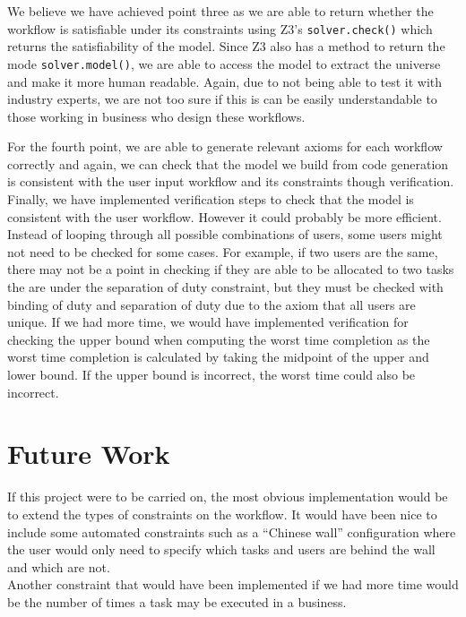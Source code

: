 \documentclass[a4paper]{report}
\begin{document}
We believe we have achieved point three as we are able to return whether the workflow is satisfiable under its constraints using Z3's \texttt{solver.check()} which returns the satisfiability of the model. Since Z3 also has a method to return the mode \texttt{solver.model()}, we are able to access the model to extract the universe and make it more human readable. Again, due to not being able to test it with industry experts, we are not too sure if this is can be easily understandable to those working in business who design these workflows.  

For the fourth point, we are able to generate relevant axioms for each workflow correctly and again, we can check that the model we build from code generation is consistent with the user input workflow and its constraints though verification.\\

Finally, we have implemented verification steps to check that the model is consistent with the user workflow. However it could probably be more efficient. Instead of looping through all possible combinations of users, some users might not need to be checked for some cases. For example, if two users are the same, there may not be a point in checking if they are able to be allocated to two tasks the are under the separation of duty constraint, but they must be checked with binding of duty and separation of duty due to the axiom that all users are unique. If we had more time, we would have implemented verification for checking the upper bound when computing the worst time completion as the worst time completion is calculated by taking the midpoint of the upper and lower bound. If the upper bound is incorrect, the worst time could also be incorrect. 

\section{Future Work}
If this project were to be carried on, the most obvious implementation would be to extend the types of constraints on the workflow. It would have been nice to include some automated constraints such as a ``Chinese wall'' configuration where the user would only need to specify which tasks and users are behind the wall and which are not. \\

Another constraint that would have been implemented if we had more time would be the number of times a task may be executed in a business. \\
\end{document}
